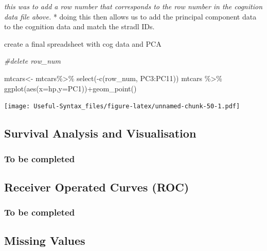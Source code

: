 \documentclass[
]{article}
\newenvironment{Shaded}{\begin{snugshade}}{\end{snugshade}}
\newcommand{\AttributeTok}[1]{\textcolor[rgb]{0.77,0.63,0.00}{#1}}
\newcommand{\CommentTok}[1]{\textcolor[rgb]{0.56,0.35,0.01}{\textit{#1}}}
\newcommand{\FunctionTok}[1]{\textcolor[rgb]{0.00,0.00,0.00}{#1}}
\newcommand{\NormalTok}[1]{#1}
\newcommand{\OtherTok}[1]{\textcolor[rgb]{0.56,0.35,0.01}{#1}}
\newcommand{\SpecialCharTok}[1]{\textcolor[rgb]{0.00,0.00,0.00}{#1}}
\begin{document}
\emph{this was to add a row number that corresponds to the row number in the cognition data file above.}
* doing this then allows us to add the principal component data to the cognition data and match the stradl IDs.

create a final spreadsheet with cog data and PCA

\begin{Shaded}
\begin{Highlighting}[]
\CommentTok{\#delete row\_num}

\NormalTok{mtcars}\OtherTok{\textless{}{-}}\NormalTok{ mtcars}\SpecialCharTok{\%\textgreater{}\%} \FunctionTok{select}\NormalTok{(}\SpecialCharTok{{-}}\FunctionTok{c}\NormalTok{(row\_num, PC3}\SpecialCharTok{:}\NormalTok{PC11))}
\NormalTok{mtcars }\SpecialCharTok{\%\textgreater{}\%} \FunctionTok{ggplot}\NormalTok{(}\FunctionTok{aes}\NormalTok{(}\AttributeTok{x=}\NormalTok{hp,}\AttributeTok{y=}\NormalTok{PC1))}\SpecialCharTok{+}\FunctionTok{geom\_point}\NormalTok{()}
\end{Highlighting}
\end{Shaded}

\texttt{[image: Useful-Syntax\_files/figure-latex/unnamed-chunk-50-1.pdf]}

\hypertarget{survival-analysis-and-visualisation}{%
\subsection{Survival Analysis and Visualisation}\label{survival-analysis-and-visualisation}}

\hypertarget{to-be-completed}{%
\subsubsection{To be completed}\label{to-be-completed}}

\hypertarget{receiver-operated-curves-roc}{%
\subsection{Receiver Operated Curves (ROC)}\label{receiver-operated-curves-roc}}

\hypertarget{to-be-completed-1}{%
\subsubsection{To be completed}\label{to-be-completed-1}}

\hypertarget{missing-values}{%
\subsection{Missing Values}\label{missing-values}}
\end{document}

